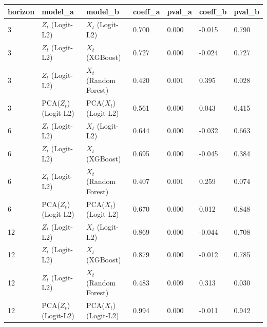 \begin{tabular}{lllllll}
\toprule
horizon & model_a & model_b & coeff_a & pval_a & coeff_b & pval_b \\
\midrule
3 & $Z_t$ (Logit-L2) & $X_t$ (Logit-L2) & 0.700 & 0.000 & -0.015 & 0.790 \\
3 & $Z_t$ (Logit-L2) & $X_t$ (XGBoost) & 0.727 & 0.000 & -0.024 & 0.727 \\
3 & $Z_t$ (Logit-L2) & $X_t$ (Random Forest) & 0.420 & 0.001 & 0.395 & 0.028 \\
3 & PCA($Z_t$) (Logit-L2) & PCA($X_t$) (Logit-L2) & 0.561 & 0.000 & 0.043 & 0.415 \\
6 & $Z_t$ (Logit-L2) & $X_t$ (Logit-L2) & 0.644 & 0.000 & -0.032 & 0.663 \\
6 & $Z_t$ (Logit-L2) & $X_t$ (XGBoost) & 0.695 & 0.000 & -0.045 & 0.384 \\
6 & $Z_t$ (Logit-L2) & $X_t$ (Random Forest) & 0.407 & 0.001 & 0.259 & 0.074 \\
6 & PCA($Z_t$) (Logit-L2) & PCA($X_t$) (Logit-L2) & 0.670 & 0.000 & 0.012 & 0.848 \\
12 & $Z_t$ (Logit-L2) & $X_t$ (Logit-L2) & 0.869 & 0.000 & -0.044 & 0.708 \\
12 & $Z_t$ (Logit-L2) & $X_t$ (XGBoost) & 0.879 & 0.000 & -0.012 & 0.785 \\
12 & $Z_t$ (Logit-L2) & $X_t$ (Random Forest) & 0.483 & 0.009 & 0.313 & 0.030 \\
12 & PCA($Z_t$) (Logit-L2) & PCA($X_t$) (Logit-L2) & 0.994 & 0.000 & -0.011 & 0.942 \\
\bottomrule
\end{tabular}
